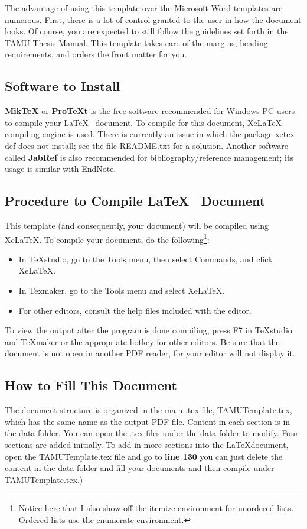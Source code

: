 The advantage of using this template over the Microsoft Word templates are numerous. First, there is a lot of control granted to the user in how the document looks. Of course, you are expected to still follow the guidelines set forth in the TAMU Thesis Manual. This template takes care of the margins, heading requirements, and orders the front matter for you.


\subsection*{Software to Install}

\textbf{MikTeX} or \textbf{ProTeXt} is the free software recommended for Windows PC users to
compile your \LaTeX ~ document. To compile for this document, XeLaTeX compiling engine
is used. There is currently an issue in which the package xetex-def does not install; see the file README.txt for a solution. Another software called \textbf{JabRef} is also recommended for bibliography/reference management; its usage is similar with EndNote.

\subsection*{Procedure to Compile \LaTeX ~ Document}

This template (and consequently, your document) will be compiled using XeLaTeX. To compile your document, do the following\footnote{Notice here that I also show off the itemize environment for unordered lists. Ordered lists use the enumerate environment.}:

\begin{itemize}
	\item In TeXstudio, go to the Tools menu, then select Commands, and click XeLaTeX.

	\item In Texmaker, go to the Tools menu and select XeLaTeX.

	\item For other editors, consult the help files included with the editor.
\end{itemize}

To view the output after the program is done compiling, press F7 in TeXstudio and TeXmaker or the appropriate hotkey for other editors. Be sure that the document is not open in another PDF reader, for your editor will not display it.

\subsection{How to Fill This Document}
The document structure is organized in the main .tex file, TAMUTemplate.tex,
which has the same name as the output PDF file. Content in each section is in the data folder. You can open the .tex files under the data folder to modify. Four sections
are added initially. To add in more sections into the \LaTeX document, open the
TAMUTemplate.tex file and go to \textbf{line 130} you can just delete the content in the data folder and fill your documents and then compile under TAMUTemplate.tex.)

